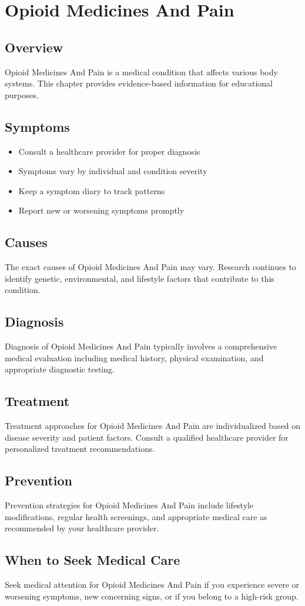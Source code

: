 \chapter{Opioid Medicines And Pain}

\section*{Overview}
Opioid Medicines And Pain is a medical condition that affects various body systems. This chapter provides evidence-based information for educational purposes.

\section*{Symptoms}
\begin{itemize}
  \item Consult a healthcare provider for proper diagnosis
  \item Symptoms vary by individual and condition severity
  \item Keep a symptom diary to track patterns
  \item Report new or worsening symptoms promptly
\end{itemize}

\section*{Causes}
The exact causes of Opioid Medicines And Pain may vary. Research continues to identify genetic, environmental, and lifestyle factors that contribute to this condition.

\section*{Diagnosis}
Diagnosis of Opioid Medicines And Pain typically involves a comprehensive medical evaluation including medical history, physical examination, and appropriate diagnostic testing.

\section*{Treatment}
Treatment approaches for Opioid Medicines And Pain are individualized based on disease severity and patient factors. Consult a qualified healthcare provider for personalized treatment recommendations.

\section*{Prevention}
Prevention strategies for Opioid Medicines And Pain include lifestyle modifications, regular health screenings, and appropriate medical care as recommended by your healthcare provider.

\section*{When to Seek Medical Care}
Seek medical attention for Opioid Medicines And Pain if you experience severe or worsening symptoms, new concerning signs, or if you belong to a high-risk group.
\clearpage
